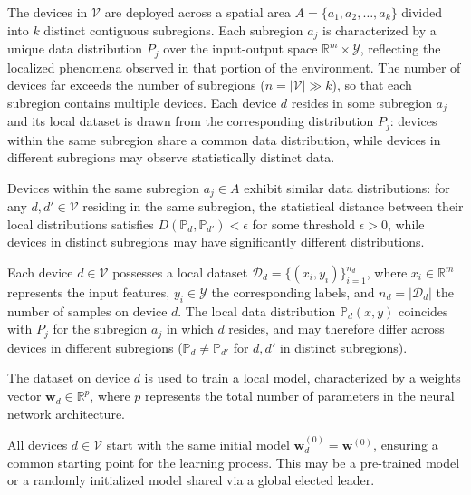 The devices in $\mathcal{V}$ are deployed across a spatial area
 $A = \{a_1, a_2, \ldots, a_k\}$ divided into $k$ distinct contiguous subregions.
%
Each subregion $a_j$ is characterized by a unique data distribution $P_j$
 over the input-output space $\mathbb{R}^m \times \mathcal{Y}$,
 reflecting the localized phenomena observed in that portion of the environment.
%
The number of devices far exceeds the number of subregions ($n = |\mathcal{V}| \gg k$),
 so that each subregion contains multiple devices.
%
Each device $d$ resides in some subregion $a_j$
 and its local dataset is drawn from the corresponding distribution $P_j$:
 devices within the same subregion share a common data distribution,
 while devices in different subregions may observe statistically distinct data.
%
\begin{assumption}\label{assumption:spatial-data-correlation}
Devices within the same subregion $a_j \in A$ exhibit similar data distributions:
 for any $d, d' \in \mathcal{V}$ residing in the same subregion,
 the statistical distance between their local distributions satisfies
 $D(\mathbb{P}_d, \mathbb{P}_{d'}) < \epsilon$ for some threshold $\epsilon > 0$,
 while devices in distinct subregions may have significantly different distributions.
\end{assumption}

Each device $d \in \mathcal{V}$ possesses a local dataset $\mathcal{D}_d = \{(x_i, y_i)\}_{i=1}^{n_d}$,
 where $x_i \in \mathbb{R}^m$ represents the input features, $y_i \in \mathcal{Y}$ the corresponding labels,
 and $n_d = |\mathcal{D}_d|$ the number of samples on device $d$.
%
The local data distribution $\mathbb{P}_d(x,y)$ coincides with $P_j$ for the subregion $a_j$
 in which $d$ resides,
 and may therefore differ across devices in different subregions
 ($\mathbb{P}_d \neq \mathbb{P}_{d'}$ for $d, d'$ in distinct subregions). 

The dataset on device $d$ is used to train a local model, 
 characterized by a weights vector $\mathbf{w}_d \in \mathbb{R}^p$, 
 where $p$ represents the total number of parameters in the neural network architecture. 
%
\begin{assumption}\label{assumption:shared-model-initialization}
All devices $d \in \mathcal{V}$ start with the same initial model $\mathbf{w}_d^{(0)} = \mathbf{w}^{(0)}$, 
 ensuring a common starting point for the learning process.
%
This may be a pre-trained model or a randomly initialized model shared via a global elected leader.
\end{assumption}

